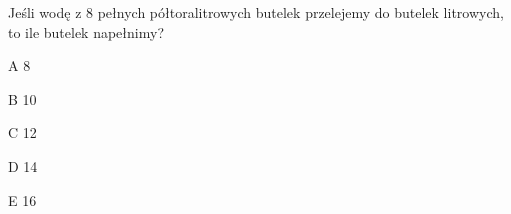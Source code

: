 \begin{tresc}
Jeśli wodę z 8 pełnych półtoralitrowych butelek przelejemy do butelek litrowych, to ile butelek napełnimy?
\end{tresc}
\begin{wariant}{A} 8 \end{wariant}
\begin{wariant}{B} 10 \end{wariant}
\begin{wariant}{C} 12 \end{wariant}
\begin{wariant}{D} 14 \end{wariant}
\begin{wariant}{E} 16 \end{wariant}
